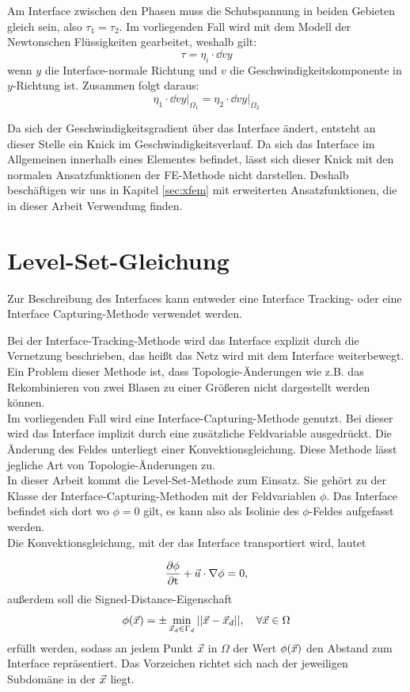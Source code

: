 Am Interface zwischen den Phasen muss die Schubspannung in beiden Gebieten gleich sein, also $\tau_1 = \tau_2$. Im vorliegenden Fall wird mit dem Modell der Newtonschen Flüssigkeiten gearbeitet, weshalb gilt: 
\[\tau = \eta_i\cdot\dd{v}{y}\]
wenn $y$ die Interface-normale Richtung und $v$ die Geschwindigkeitskomponente in $y$-Richtung ist. Zusammen folgt daraus:
\[\eta_1\cdot\dd{v}{y}\biggr|_{\Omega_1} = \eta_2\cdot\dd{v}{y}\biggr|_{\Omega_2}\]

Da sich der Geschwindigkeitsgradient über das Interface ändert, entsteht an dieser Stelle ein Knick im Geschwindigkeitsverlauf. Da sich das Interface im Allgemeinen innerhalb eines Elementes befindet, lässt sich dieser Knick mit den normalen Ansatzfunktionen der FE-Methode nicht darstellen. Deshalb beschäftigen wir uns in Kapitel \ref{sec:xfem} mit erweiterten Ansatzfunktionen, die in dieser Arbeit Verwendung finden.

\section{Level-Set-Gleichung}
Zur Beschreibung des Interfaces kann entweder eine Interface Tracking- oder eine Interface Capturing-Methode verwendet werden.

Bei der Interface-Tracking-Methode wird das Interface explizit durch die
Vernetzung beschrieben, das heißt das Netz wird mit dem Interface weiterbewegt. Ein Problem dieser Methode ist, dass Topologie-Änderungen wie z.B. das Rekombinieren von zwei Blasen zu einer Größeren nicht dargestellt werden können.\\

Im vorliegenden Fall wird eine Interface-Capturing-Methode genutzt. Bei dieser wird das Interface implizit durch eine zusätzliche Feldvariable ausgedrückt. Die Änderung des Feldes unterliegt einer Konvektionsgleichung. Diese Methode lässt jegliche Art von Topologie-Änderungen zu.\\

In dieser Arbeit kommt die Level-Set-Methode zum Einsatz. Sie gehört zu
der Klasse der Interface-Capturing-Methoden mit der Feldvariablen \(\phi\). Das Interface befindet sich dort wo \(\phi = 0\) gilt, es kann also als Isolinie des \(\phi\)-Feldes aufgefasst werden.\\

Die Konvektionsgleichung, mit der das Interface transportiert wird, lautet

\begin{equation}
\frac{\partial \phi}{\partial \mathrm{t}} +  \vec{u} \cdot \nabla\phi = 0,
\end{equation}
außerdem soll die Signed-Distance-Eigenschaft
\begin{equation}
 \phi(\vec{x}) = \pm \min_{\vec{x}_d\in\Gamma_d}{||\vec{x}-\vec{x}_d||}, \quad \forall\vec{x} \in \Omega
\end{equation} 
erfüllt werden, sodass an jedem Punkt $\vec{x}$ in $\Omega$ der Wert $\phi(\vec{x})$ den Abstand zum Interface repräsentiert. Das Vorzeichen richtet sich nach der jeweiligen Subdomäne in der $\vec{x}$ liegt.

